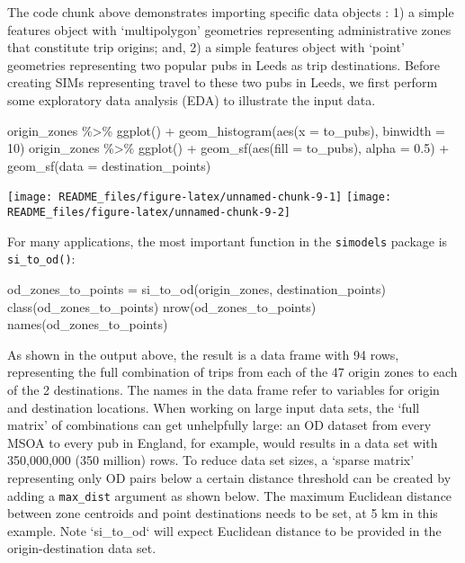 \documentclass[11pt,letterpaper]{article}
\newenvironment{Shaded}{\begin{snugshade}}{\end{snugshade}}
\newcommand{\AttributeTok}[1]{\textcolor[rgb]{0.77,0.63,0.00}{#1}}
\newcommand{\DecValTok}[1]{\textcolor[rgb]{0.00,0.00,0.81}{#1}}
\newcommand{\FloatTok}[1]{\textcolor[rgb]{0.00,0.00,0.81}{#1}}
\newcommand{\FunctionTok}[1]{\textcolor[rgb]{0.00,0.00,0.00}{#1}}
\newcommand{\NormalTok}[1]{#1}
\newcommand{\OtherTok}[1]{\textcolor[rgb]{0.56,0.35,0.01}{#1}}
\newcommand{\SpecialCharTok}[1]{\textcolor[rgb]{0.00,0.00,0.00}{#1}}
\begin{document}
The code chunk above demonstrates importing specific data objects : 1) a simple features object with `multipolygon' geometries representing administrative zones that constitute trip origins; and, 2) a simple features object with `point' geometries representing two popular pubs in Leeds as trip destinations.
Before creating SIMs representing travel to these two pubs in Leeds, we first perform some exploratory data analysis (EDA) to illustrate the input data.

\begin{Shaded}
\begin{Highlighting}[]
\NormalTok{origin\_zones }\SpecialCharTok{\%\textgreater{}\%} 
  \FunctionTok{ggplot}\NormalTok{() }\SpecialCharTok{+}
  \FunctionTok{geom\_histogram}\NormalTok{(}\FunctionTok{aes}\NormalTok{(}\AttributeTok{x =}\NormalTok{ to\_pubs), }\AttributeTok{binwidth =} \DecValTok{10}\NormalTok{)}
\NormalTok{origin\_zones }\SpecialCharTok{\%\textgreater{}\%} 
  \FunctionTok{ggplot}\NormalTok{() }\SpecialCharTok{+}
  \FunctionTok{geom\_sf}\NormalTok{(}\FunctionTok{aes}\NormalTok{(}\AttributeTok{fill =}\NormalTok{ to\_pubs), }\AttributeTok{alpha =} \FloatTok{0.5}\NormalTok{) }\SpecialCharTok{+}
  \FunctionTok{geom\_sf}\NormalTok{(}\AttributeTok{data =}\NormalTok{ destination\_points)}
\end{Highlighting}
\end{Shaded}

\texttt{[image: README\_files/figure-latex/unnamed-chunk-9-1]} \texttt{[image: README\_files/figure-latex/unnamed-chunk-9-2]}

For many applications, the most important function in the \texttt{simodels} package is \texttt{si\_to\_od()}:

\begin{Shaded}
\begin{Highlighting}[]
\NormalTok{od\_zones\_to\_points }\OtherTok{=} \FunctionTok{si\_to\_od}\NormalTok{(origin\_zones, destination\_points)}
\FunctionTok{class}\NormalTok{(od\_zones\_to\_points)}
\FunctionTok{nrow}\NormalTok{(od\_zones\_to\_points)}
\FunctionTok{names}\NormalTok{(od\_zones\_to\_points)}
\end{Highlighting}
\end{Shaded}

As shown in the output above, the result is a data frame with 94 rows, representing the full combination of trips from each of the 47 origin zones to each of the 2 destinations.
The names in the data frame refer to variables for origin and destination locations.
When working on large input data sets, the `full matrix' of combinations can get unhelpfully large: an OD dataset from every MSOA to every pub in England, for example, would results in a data set with 350,000,000 (350 million) rows.
To reduce data set sizes, a `sparse matrix' representing only OD pairs below a certain distance threshold can be created by adding a \texttt{max\_dist} argument as shown below.
The maximum Euclidean distance between zone centroids and point destinations needs to be set, at 5 km in this example.
Note `si\_to\_od` will expect Euclidean distance to be provided in the origin-destination data set.
\end{document}
